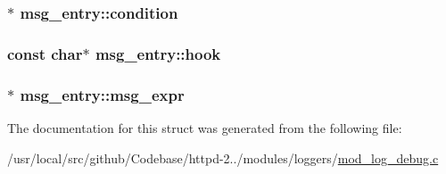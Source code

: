 \subsubsection[{\texorpdfstring{condition}{condition}}]{$\ast$ msg\+\_\+entry\+::condition}\hypertarget{structmsg__entry_a6be3402daa9c35952625d8463e0ceefd}{}\label{structmsg__entry_a6be3402daa9c35952625d8463e0ceefd}
\subsubsection[{\texorpdfstring{hook}{hook}}]{\setlength{\rightskip}{0pt plus 5cm}const char$\ast$ msg\+\_\+entry\+::hook}\hypertarget{structmsg__entry_a83544ac08bfa92a6905b5f7cf0bea210}{}\label{structmsg__entry_a83544ac08bfa92a6905b5f7cf0bea210}
\subsubsection[{\texorpdfstring{msg\+\_\+expr}{msg_expr}}]{$\ast$ msg\+\_\+entry\+::msg\+\_\+expr}\hypertarget{structmsg__entry_a2c758d8453a26fd0868c187b0c86afb0}{}\label{structmsg__entry_a2c758d8453a26fd0868c187b0c86afb0}


The documentation for this struct was generated from the following file\+:\begin{DoxyCompactItemize}
\item 
/usr/local/src/github/\+Codebase/httpd-\/2../modules/loggers/\hyperlink{mod__log__debug_8c}{mod\+\_\+log\+\_\+debug.\+c}\end{DoxyCompactItemize}
